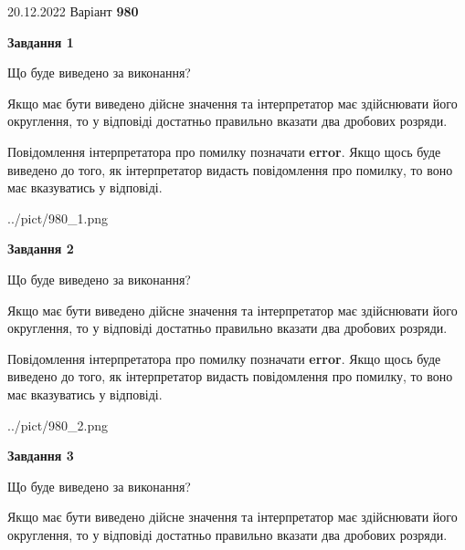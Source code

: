 \documentclass[12pt, ukrainian]{article}
\begin{document}
{20.12.2022 Варіант \No \textbf { 980 }\par}
{
\begin {Large}

{\begin {center}\textbf{Завдання 1}\end {center}}\par
Що буде виведено за виконання? \par

Якщо має бути виведено дійсне значення та інтерпретатор має здійснювати його округлення, 
то у відповіді достатньо правильно вказати два дробових розряди.

Повідомлення інтерпретатора про помилку позначати \textbf{error}.
Якщо щось буде виведено до того, як інтерпретатор видасть повідомлення про помилку, 
то воно має вказуватись у відповіді. \par

\begin{center}
	{../pict/980_1.png}
\end{center}
\newpage

{\begin {center}\textbf{Завдання 2}\end {center}}\par
Що буде виведено за виконання? \par

Якщо має бути виведено дійсне значення та інтерпретатор має здійснювати його округлення, 
то у відповіді достатньо правильно вказати два дробових розряди.

Повідомлення інтерпретатора про помилку позначати \textbf{error}.
Якщо щось буде виведено до того, як інтерпретатор видасть повідомлення про помилку, 
то воно має вказуватись у відповіді. \par

\begin{center}
	{../pict/980_2.png}
\end{center}
\newpage

{\begin {center}\textbf{Завдання 3}\end {center}}\par
Що буде виведено за виконання? \par

Якщо має бути виведено дійсне значення та інтерпретатор має здійснювати його округлення, 
то у відповіді достатньо правильно вказати два дробових розряди.


\end{Large}}
\end{document}

